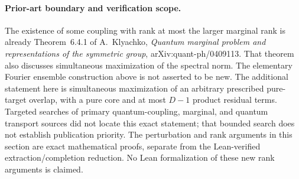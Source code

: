 \paragraph{Prior-art boundary and verification scope.}
The existence of some coupling with rank at most the larger marginal
rank is already Theorem~6.4.1 of A.~Klyachko,
\emph{Quantum marginal problem and representations of the symmetric
group}, arXiv:quant-ph/0409113. That theorem also discusses simultaneous
maximization of the spectral norm. The elementary Fourier ensemble
construction above is not asserted to be new. The additional statement
here is simultaneous maximization of an arbitrary prescribed pure-target
overlap, with a pure core and at most $D-1$ product residual terms.
Targeted searches of primary quantum-coupling, marginal, and quantum
transport sources did not locate this exact statement; that bounded
search does not establish publication priority. The perturbation and
rank arguments in this section are exact mathematical proofs, separate
from the Lean-verified extraction/completion reduction. No Lean
formalization of these new rank arguments is claimed.
